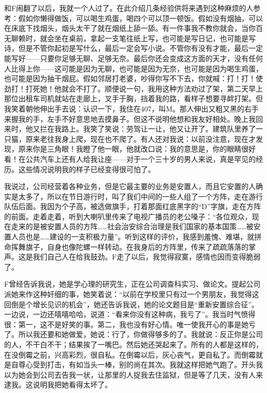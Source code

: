 和F闹翻了以后，我就一个人过了。在此介绍几条经验供将来遇到这种麻烦的人参考：假如你懒得做饭，可以喝生鸡蛋，喝四个可以顶一顿饭。假如没有烟抽，可以在床底下找烟头，烟头太干了就在烟纸上舔一舔。有一件事我不教你就会，当你百无聊赖时，就会坐在桌前，拿起一支笔往纸上写，也可能是写日记，也可能是写诗，但是不管你起初是写什么，最后一定会写小说。不管你有没有才能，最后一定能写好——只要你足够无聊、足够无奈。最后你还会变成这方面的天才，没有任何人比得上你——这可能是因为无聊，也可能是因为无奈，也可能是因为喝生鸡蛋，也可能是因为抽干烟屁。假如邻居打老婆，吵得你写不下去，你就喊：打！打！使劲打！打死她！他就会不打了。顺便说一句，我用这种方法劝过了架，第二天早上那位出租车司机就站在走廊上，叉手于胸，挡着我的路，看样子想要寻衅打架。但我笑着朝他伸出手去说：认识一下，我住在407，叫M。那人伸出又粗又黑的右手来握我的手，左手不好意思地去摸鼻子。但这不说明他想和我友好相处。晚上我回来时，他又拦在我路上。我笑了笑说：劳驾让一让，他又让开了。建筑队里养了一只猫，原来老往我身上爬，现在也不爬了。有人还对我说：以前没注意，现在才发现，原来你是三角眼！我瞪了他一眼，他就改口说：我的意思是，你的眼睛很好看！在公共汽车上还有人给我让座——对于一个三十岁的男人来说，真是罕见的经历。这些情况说明我的样子已经变得很可怕了。 

我说过，公司经营着各种业务，但是它最主要的业务是安置人，而且它安置的人确实是太多了，所以在节日游行时，叫了我们中间的一些人组了一个方阵，走在游行队伍后面。我因为个子高，被选做旗手，打着那面红底黑字的“D”字旗，走在方阵的前面。走着走着，听到大喇叭里传来了电视广播员的老公嗓子：“各位观众，现在走来的是被安置人员的方阵……社会治安综合治理是我们国家的基本国策……被安置人员也是……建设的一支积极力量”。听到这样的评价，我感到羞愧、难堪，就拼命挥舞旗子，自身也像陀螺一样转动。在我身后的方阵里，传来了疏疏落落的掌声。这是我们自己人在给我鼓劲。F走了以后，我觉得寂寞，感情也因而变得脆弱了。 

F曾经告诉我说，她是学心理的研究生，正在公司调查科实习、做论文。提起公司派她来作这种奸细的事，她笑着说：“以前在学校里只有过一个男朋友，我觉得这回倒是个增长见识的机会”，她还告诉我说，她的论文题目是“重新安置综合征”。一边说，一边还嘻嘻哈哈，说道：“看来你没有这种病，我亏了”。我当时气愤得很：第一，这不是好笑的事。第二，我也没有好心情。唯一使我开心的事是她亏了。所以我还要和她做爱，她说：行了，你做得够多的了。我就说：反正你是公司的人，不干白不干；结果挨了一嘴巴。然后她还哭起来了。所有的人都是这样的，在没倒霉之前，兴高彩烈，很自私。在倒霉以后，灰心丧气，更自私了。而倒霉就是自尊心受到打击，有如当头一棒，别的尚在其次。我就这样把她气跑了。开头我以为她会到公司去告我一状，让那里的人捉我去住监狱，但是等了几天，没有人来逮我。这说明我把她看得太坏了。

